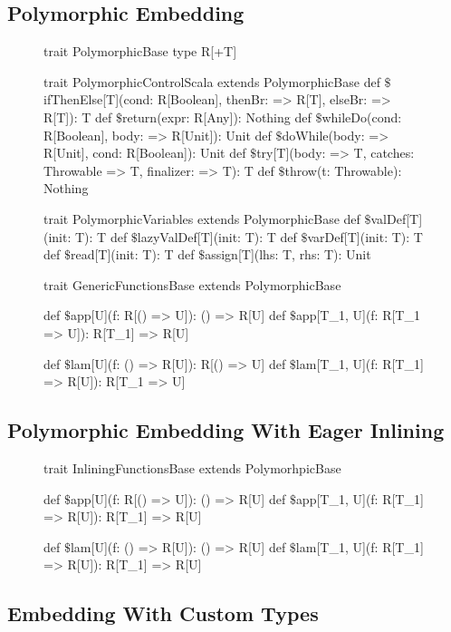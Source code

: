 \subsection{Polymorphic Embedding}
\label{sct:polymorphic-embedding}

\begin{figure}
\begin{listingtiny}
trait PolymorphicBase {
  type R[+T]
}

trait PolymorphicControlScala extends PolymorphicBase {
  def $\$$ifThenElse[T](cond: R[Boolean], thenBr: => R[T], elseBr: => R[T]): T
  def $\$$return(expr: R[Any]): Nothing
  def $\$$whileDo(cond: R[Boolean], body: => R[Unit]): Unit
  def $\$$doWhile(body: => R[Unit], cond: R[Boolean]): Unit
  def $\$$try[T](body: => T, catches: Throwable => T, finalizer: => T): T
  def $\$$throw(t: Throwable): Nothing
}

trait PolymorphicVariables extends PolymorphicBase {
  def $\$$valDef[T](init: T): T
  def $\$$lazyValDef[T](init: T): T
  def $\$$varDef[T](init: T): T
  def $\$$read[T](init: T): T
  def $\$$assign[T](lhs: T, rhs: T): Unit
}

trait GenericFunctionsBase extends PolymorphicBase {
  def $\$$app[U](f: R[() => U]): () => R[U]
  def $\$$app[T_1, U](f: R[T_1 => U]): R[T_1] => R[U]

  def $\$$lam[U](f: () => R[U]): R[() => U]
  def $\$$lam[T_1, U](f: R[T_1] => R[U]): R[T_1 => U]
}
\end{listingtiny}
\end{figure}

\subsection{Polymorphic Embedding With Eager Inlining}
\label{sct:polymorphic-embedding-with-eager-inlining}
\begin{figure}
\begin{listingtiny}
trait InliningFunctionsBase extends PolymorhpicBase {
  def $\$$app[U](f: R[() => U]): () => R[U]
  def $\$$app[T_1, U](f: R[T_1] => R[U]): R[T_1] => R[U]

  def $\$$lam[U](f: () => R[U]): () => R[U]
  def $\$$lam[T_1, U](f: R[T_1] => R[U]): R[T_1] => R[U]
}
\end{listingtiny}
\end{figure}

\subsection{Embedding With Custom Types}
\label{sct:embedding-with-custom-types}


